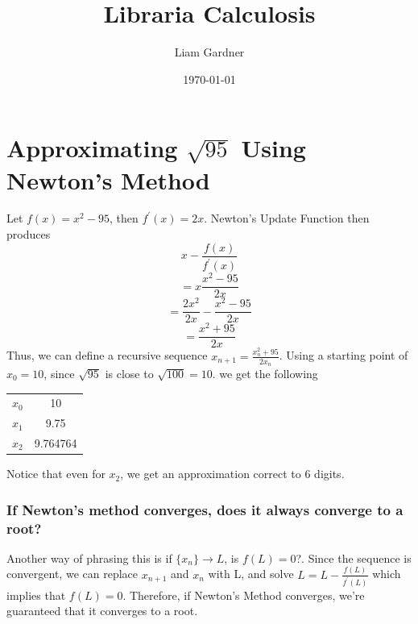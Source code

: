 \documentclass[oneside]{book}
\title{Libraria Calculosis}
\author{Liam Gardner}
\date{\today}
\newcommand\tab[1][1cm]{\hspace*{#1}}
\newcommand\nextline{\newline\tab}
\begin{document}
\DeclarePairedDelimiter\abs{\lvert}{\rvert}

\maketitle
\tableofcontents
\chapter{Approximating $\sqrt{95}$ Using Newton's Method}
\tab
Let $f(x)=x^2-95$, then $f^\prime(x) = 2x$. Newton's Update Function then produces
$$x-\frac{f(x)}{f^\prime(x)}$$
$$=x\frac{x^2-95}{2x}$$
$$=\frac{2x^2}{2x} - \frac{x^2-95}{2x}$$
$$=\frac{x^2+95}{2x}$$
\tab
Thus, we can define a recursive sequence $x_{n+1} = \frac{x_n^2 + 95}{2x_n}$. Using a starting point of $x_0=10$, since $\sqrt{95}$ is close to $\sqrt{100}=10$. we get the following
\nextline
\begin{center}
\begin{tabular}{|c|c|}
\hline
$x_0$ & 10 \\
$x_1$ & 9.75 \\
$x_2$ & 9.764764 \\
\hline
\end{tabular}
\end{center}
\tab
Notice that even for $x_2$, we get an approximation correct to 6 digits.
\subsection{If Newton's method converges, does it always converge to a root?}
\tab
Another way of phrasing this is if $\{x_n\}\rightarrow L$, is $f(L)=0$?.
\nextline
Since the sequence is convergent, we can replace $x_{n+1}$ and $x_n$ with L, and solve $L=L-\frac{f(L)}{f^\prime(L)}$ which implies that $f(L)=0$. Therefore, if Newton's Method converges, we're guaranteed that it converges to a root.	
\end{document}
